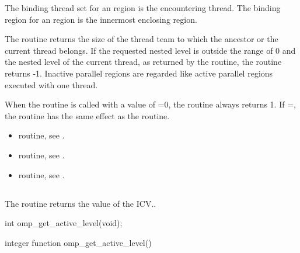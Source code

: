 \binding
The binding thread set for an  region is 
the encountering thread. The binding region for an  
region is the innermost enclosing  region.

\effect
The  routine returns the size of the thread 
team to which the ancestor or the current thread belongs. If the 
requested nested level is outside the range of 0 and the nested level 
of the current thread, as returned by the  routine, 
the routine returns -1. Inactive parallel regions are regarded like 
active parallel regions executed with one thread.

\begin{note}
When the  routine is called with a value of 
=0, the routine always returns 1. If 
=, the routine has the same
effect as the\linebreak {} routine.
\end{note}

\crossreferences
\begin{itemize}
\item {} routine, see
.

\item {} routine, see
.

\item {} routine, see
.
\end{itemize}



\subsection{}
\label{subsec:omp_get_active_level}
\summary
The  routine returns the value of 
the  ICV..

\format
\begin{ccppspecific}
\begin{ompcFunction}
int omp_get_active_level(void);
\end{ompcFunction}
\end{ccppspecific}

\begin{fortranspecific}
\begin{ompfFunction}
integer function omp_get_active_level()
\end{ompfFunction}
\end{fortranspecific}

